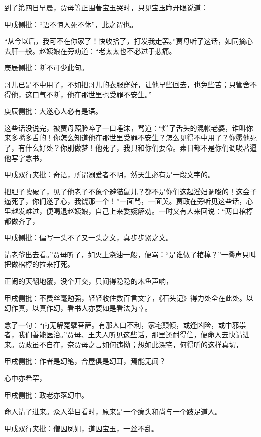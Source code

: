 \begin{parag}
    到了第四日早晨，贾母等正围著宝玉哭时，只见宝玉睁开眼说道：\begin{note}甲戌侧批：“语不惊人死不休”，此之谓也。\end{note}“从今以后，我可不在你家了！快收拾了，打发我走罢。”贾母听了这话，如同摘心去肝一般。赵姨娘在旁劝道：“老太太也不必过于悲痛。\begin{note}庚辰侧批：断不可少此句。\end{note}哥儿已是不中用了，不如把哥儿的衣服穿好，让他早些回去，也免些苦；只管舍不得他，这口气不断，他在那世里也受罪不安生。”\begin{note}庚辰侧批：大遂心人必有是语。\end{note}这些话没说完，被贾母照脸啐了一口唾沫，骂道：“烂了舌头的混帐老婆，谁叫你来多嘴多舌的！你怎么知道他在那世里受罪不安生？怎么见得不中用了？你愿他死了，有什么好处？你别做梦！他死了，我只和你们要命。素日都不是你们调唆著逼他写字念书，\begin{note}甲戌双行夹批：奇语，所谓溺爱者不明，然天生必有是一段文字的。\end{note}把胆子唬破了，见了他老子不象个避猫鼠儿？都不是你们这起淫妇调唆的！这会子逼死了，你们遂了心，我饶那一个！”一面骂，一面哭。贾政在旁听见这些话，心里越发难过，便喝退赵姨娘，自己上来委婉解劝。一时又有人来回说：“两口棺椁都做齐了，\begin{note}甲戌侧批：偏写一头不了又一头之文，真步步紧之文。\end{note}请老爷出去看。”贾母听了，如火上浇油一般，便骂：“是谁做了棺椁？”一叠声只叫把做棺椁的拉来打死。
\end{parag}


\begin{parag}
    正闹的天翻地覆，没个开交，只闻得隐隐的木鱼声响，\begin{note}甲戌侧批：不费丝毫勉强，轻轻收住数百言文字，《石头记》得力处全在此处。以幻作真，以真作幻，看书人亦要如是看法为幸。\end{note}念了一句：“南无解冤孽菩萨。有那人口不利，家宅颠倾，或逢凶险，或中邪祟者，我们善能医治。”贾母、王夫人听见这些话，那里还耐得住，便命人去快请进来。贾政虽不自在，奈贾母之言如何违拗；想如此深宅，何得听的这样真切，\begin{note}甲戌侧批：作者是幻笔，合屋俱是幻耳，焉能无闻？\end{note}心中亦希罕，\begin{note}甲戌侧批：政老亦落幻中。\end{note}命人请了进来。众人举目看时，原来是一个癞头和尚与一个跛足道人。\begin{note}甲戌双行夹批：僧因凤姐，道因宝玉，一丝不乱。\end{note}
\end{parag}


